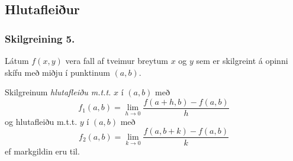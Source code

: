 \date{19.~janúar 2015}



\subsection{}
	\maketitle






\subsection{Hlutafleiður}
\subsubsection{Skilgreining 5.}
 Látum $f(x,y)$ vera fall af tveimur breytum $x$ og $y$ sem er skilgreint á opinni skífu með miðju í punktinum $(a,b)$. 
 
 \medskip
 Skilgreinum \emph{hlutafleiðu m.t.t.} $x$ í $(a,b)$ með
$$f_1(a,b)=\lim_{h\rightarrow 0}\frac{f(a+h,b)-f(a,b)}{h}$$
og {hlutafleiðu m.t.t.} $y$ í $(a,b)$ með
$$f_2(a,b)=\lim_{k\rightarrow 0}\frac{f(a,b+k)-f(a,b)}{k}$$
ef markgildin eru til.





